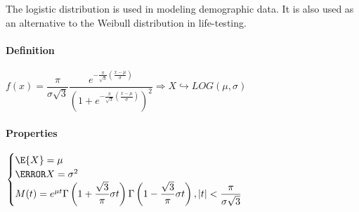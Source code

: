 The logistic distribution is used in modeling demographic data. It is also
used as an alternative to the Weibull distribution in life-testing.
\paragraph{Definition}
\begin{center}
	$f(x)=\dfrac{\pi}{\sigma\sqrt{3}}\dfrac{e^{-\frac{\pi}{\sqrt{3}}\left( \frac{x-\mu}{\sigma} \right)}}{\left( 1+e^{-\frac{\pi}{\sqrt{3}}\left( \frac{x-\mu}{\sigma} \right)} \right)^{2}}\Rightarrow X\hookrightarrow LOG(\mu,\sigma)$
\end{center}
\paragraph{Properties}
\begin{center}
	$\begin{cases}
		\E{X}=\mu\\
		\V{X}=\sigma^{2}\\
		M(t)=e^{\mu t}\Gamma\left( 1+\dfrac{\sqrt{3}}{\pi}\sigma t \right)\Gamma\left(1-\dfrac{\sqrt{3}}{\pi}\sigma t\right), |t|<\dfrac{\pi}{\sigma\sqrt{3}}
	\end{cases}$
\end{center}

